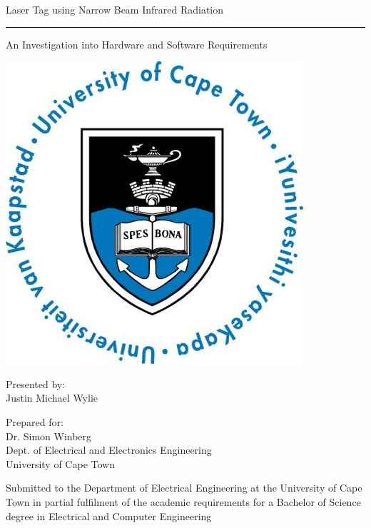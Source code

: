 \documentclass[a4paper,12pt]{report}
\begin{document}
\thispagestyle{empty}
{\Huge \begin{center}
Laser Tag using Narrow Beam Infrared Radiation
\hrule 
{\Large An Investigation into Hardware and Software Requirements}
\end{center}}

\vskip 5mm
\begin{center}
\- \- \- \- \- \- \- \- \- \-\includegraphics[scale = 0.3]{figures/template/uctLogo.png}
\end{center}

\vskip 5mm
\begin{center}
Presented by:\\
Justin Michael Wylie		%
\end{center}

\vskip 10mm
\begin{center}
Prepared for:\\
Dr. Simon Winberg\\ 		%
Dept. of Electrical and Electronics Engineering\\University of Cape Town
\end{center}


\vskip 10mm
\begin{center}
Submitted to the Department of Electrical Engineering at the University of Cape Town in partial
fulfilment of the academic requirements for a Bachelor of Science degree in Electrical and Computer Engineering

\end{center}
\end{document}
